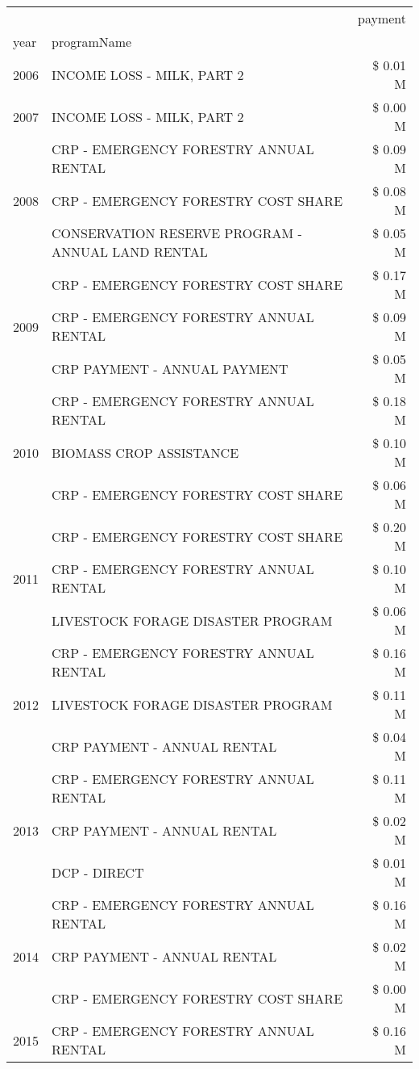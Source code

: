 \begin{tabular}{llr}
\toprule
 &  & payment \\
year & programName &  \\
\midrule
2006 & INCOME LOSS - MILK, PART 2 & \$ 0.01 M \\
\cline{1-3}
2007 & INCOME LOSS - MILK, PART 2 & \$ 0.00 M \\
\cline{1-3}
\multirow[t]{3}{*}{2008} & CRP - EMERGENCY FORESTRY ANNUAL RENTAL & \$ 0.09 M \\
 & CRP - EMERGENCY FORESTRY COST SHARE & \$ 0.08 M \\
 & CONSERVATION RESERVE PROGRAM - ANNUAL LAND RENTAL & \$ 0.05 M \\
\cline{1-3}
\multirow[t]{3}{*}{2009} & CRP - EMERGENCY FORESTRY COST SHARE & \$ 0.17 M \\
 & CRP - EMERGENCY FORESTRY ANNUAL RENTAL & \$ 0.09 M \\
 & CRP PAYMENT - ANNUAL PAYMENT & \$ 0.05 M \\
\cline{1-3}
\multirow[t]{3}{*}{2010} & CRP - EMERGENCY FORESTRY ANNUAL RENTAL & \$ 0.18 M \\
 & BIOMASS CROP ASSISTANCE & \$ 0.10 M \\
 & CRP - EMERGENCY FORESTRY COST SHARE & \$ 0.06 M \\
\cline{1-3}
\multirow[t]{3}{*}{2011} & CRP - EMERGENCY FORESTRY COST SHARE & \$ 0.20 M \\
 & CRP - EMERGENCY FORESTRY ANNUAL RENTAL & \$ 0.10 M \\
 & LIVESTOCK FORAGE DISASTER PROGRAM & \$ 0.06 M \\
\cline{1-3}
\multirow[t]{3}{*}{2012} & CRP - EMERGENCY FORESTRY ANNUAL RENTAL & \$ 0.16 M \\
 & LIVESTOCK FORAGE DISASTER PROGRAM & \$ 0.11 M \\
 & CRP PAYMENT - ANNUAL RENTAL & \$ 0.04 M \\
\cline{1-3}
\multirow[t]{3}{*}{2013} & CRP - EMERGENCY FORESTRY ANNUAL RENTAL & \$ 0.11 M \\
 & CRP PAYMENT - ANNUAL RENTAL & \$ 0.02 M \\
 & DCP - DIRECT & \$ 0.01 M \\
\cline{1-3}
\multirow[t]{3}{*}{2014} & CRP - EMERGENCY FORESTRY ANNUAL RENTAL & \$ 0.16 M \\
 & CRP PAYMENT - ANNUAL RENTAL & \$ 0.02 M \\
 & CRP - EMERGENCY FORESTRY COST SHARE & \$ 0.00 M \\
\cline{1-3}
\multirow[t]{3}{*}{2015} & CRP - EMERGENCY FORESTRY ANNUAL RENTAL & \$ 0.16 M \\

\end{tabular}
